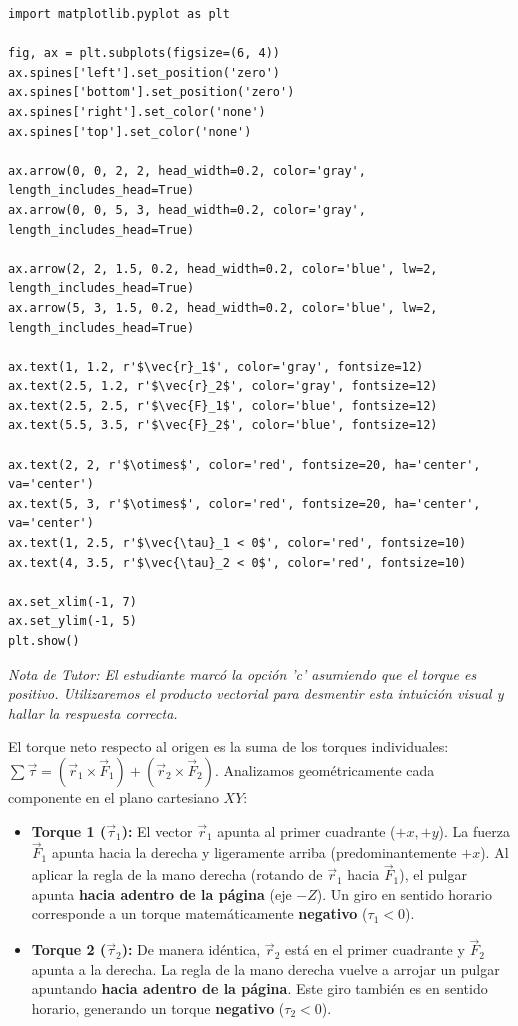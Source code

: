 \documentclass[12pt, a4paper]{article}
\begin{document}
\begin{verbatim}
import matplotlib.pyplot as plt

fig, ax = plt.subplots(figsize=(6, 4))
ax.spines['left'].set_position('zero')
ax.spines['bottom'].set_position('zero')
ax.spines['right'].set_color('none')
ax.spines['top'].set_color('none')

ax.arrow(0, 0, 2, 2, head_width=0.2, color='gray', length_includes_head=True)
ax.arrow(0, 0, 5, 3, head_width=0.2, color='gray', length_includes_head=True)

ax.arrow(2, 2, 1.5, 0.2, head_width=0.2, color='blue', lw=2, length_includes_head=True)
ax.arrow(5, 3, 1.5, 0.2, head_width=0.2, color='blue', lw=2, length_includes_head=True)

ax.text(1, 1.2, r'$\vec{r}_1$', color='gray', fontsize=12)
ax.text(2.5, 1.2, r'$\vec{r}_2$', color='gray', fontsize=12)
ax.text(2.5, 2.5, r'$\vec{F}_1$', color='blue', fontsize=12)
ax.text(5.5, 3.5, r'$\vec{F}_2$', color='blue', fontsize=12)

ax.text(2, 2, r'$\otimes$', color='red', fontsize=20, ha='center', va='center')
ax.text(5, 3, r'$\otimes$', color='red', fontsize=20, ha='center', va='center')
ax.text(1, 2.5, r'$\vec{\tau}_1 < 0$', color='red', fontsize=10)
ax.text(4, 3.5, r'$\vec{\tau}_2 < 0$', color='red', fontsize=10)

ax.set_xlim(-1, 7)
ax.set_ylim(-1, 5)
plt.show()
\end{verbatim}

\textit{Nota de Tutor: El estudiante marcó la opción 'c' asumiendo que el torque es positivo. Utilizaremos el producto vectorial para desmentir esta intuición visual y hallar la respuesta correcta.}

El torque neto respecto al origen es la suma de los torques individuales: $\sum \vec{\tau} = (\vec{r}_1 \times \vec{F}_1) + (\vec{r}_2 \times \vec{F}_2)$.
Analizamos geométricamente cada componente en el plano cartesiano $XY$:
\begin{itemize}
    \item \textbf{Torque 1 ($\vec{\tau}_1$):} El vector $\vec{r}_1$ apunta al primer cuadrante ($+x, +y$). La fuerza $\vec{F}_1$ apunta hacia la derecha y ligeramente arriba (predominantemente $+x$). Al aplicar la regla de la mano derecha (rotando de $\vec{r}_1$ hacia $\vec{F}_1$), el pulgar apunta \textbf{hacia adentro de la página} (eje $-Z$). Un giro en sentido horario corresponde a un torque matemáticamente \textbf{negativo} ($\tau_1 < 0$).
    \item \textbf{Torque 2 ($\vec{\tau}_2$):} De manera idéntica, $\vec{r}_2$ está en el primer cuadrante y $\vec{F}_2$ apunta a la derecha. La regla de la mano derecha vuelve a arrojar un pulgar apuntando \textbf{hacia adentro de la página}. Este giro también es en sentido horario, generando un torque \textbf{negativo} ($\tau_2 < 0$).
\end{itemize}
\end{document}
